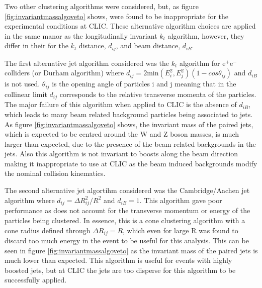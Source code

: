 Two other clustering algorithms were considered, but, as figure \ref{fig:invariantmassalgoveto} shows, were found to be inappropriate for the experimental conditions at CLIC.  These alternative algorithm choices are applied in the same manor as the longitudinally invariant $k_{t}$ algorithm, however, they differ in their for the $k_{t}$ distance, $d_{ij}$, and beam distance, $d_{iB}$.

The first alternative jet algorithm considered was the $k_{t}$ algorithm for $\text{e}^{+}\text{e}^{-}$ colliders (or Durham algorithm) where $d_{ij} = 2\text{min}(E_{i}^{2}, E_{j}^{2})(1-cos\theta_{ij})$ and $d_{iB}$ is not used.  $\theta_{ij}$ is the opening angle of particles i and j meaning that in the collinear limit $d_{ij}$ corresponds to the relative transverse momenta of the particles.  The major failure of this algorithm when applied to CLIC is the absence of $d_{iB}$, which leads to many beam related background particles being associated to jets.  As figure \ref{fig:invariantmassalgoveto} shows, the invariant mass of the paired jets, which is expected to be centred around the W and Z boson masses, is much larger than expected, due to the presence of the beam related backgrounds in the jets.  Also this algorithm is not invariant to boosts along the beam direction making it inappropriate to use at CLIC as the beam induced backgrounds modify the nominal collision kinematics.  

The second alternative jet algortihm considered was the Cambridge/Aachen jet algorithm where $d_{ij} = {\Delta}R_{ij}^{2}/R^2$ and $d_{iB} = 1$.  This algorithm gave poor performance as does not account for the transverse momentum or energy of the particles being clustered. In essence, this is a cone clustering algorithm with a cone radius defined through ${\Delta}R_{ij} = R$, which even for large R was found to discard too much energy in the event to be useful for this analysis.  This can be seen in figure \ref{fig:invariantmassalgoveto} as the invariant mass of the paired jets is much lower than expected.  This algorithm is useful for events with highly boosted jets, but at CLIC the jets are too disperse for this algorithm to be successfully applied.

